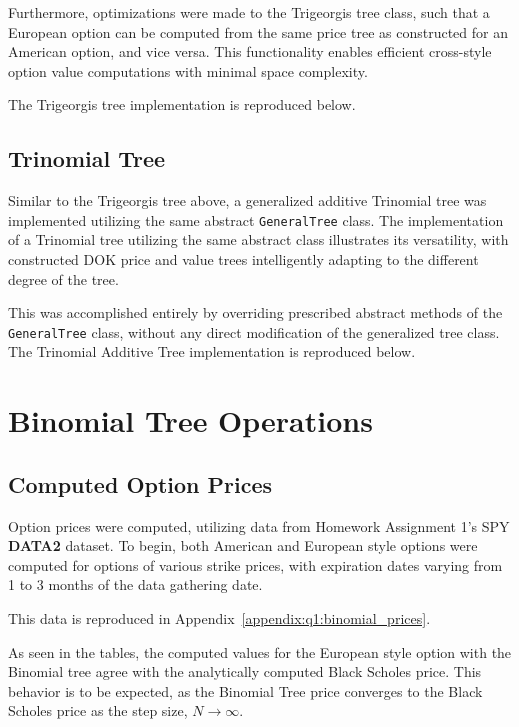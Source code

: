 \documentclass[10pt]{article}
\begin{document}
    Furthermore, optimizations were made to the Trigeorgis tree class, such that a European option can be computed from the same price tree as constructed for an American option, and vice versa. This functionality enables efficient cross-style option value computations with minimal space complexity.

    The Trigeorgis tree implementation is reproduced below.

        

    \newpage
    \subsection{Trinomial Tree}

    
    Similar to the Trigeorgis tree above, a generalized additive Trinomial tree was implemented utilizing the same abstract \texttt{GeneralTree} class. The implementation of a Trinomial tree utilizing the same abstract class illustrates its versatility, with constructed DOK price and value trees intelligently adapting to the different degree of the tree.
    
    This was accomplished entirely by overriding prescribed abstract methods of the \texttt{GeneralTree} class, without any direct modification of the generalized tree class. The Trinomial Additive Tree implementation is reproduced below.

    
    
\newpage
\section{Binomial Tree Operations}

    \subsection{Computed Option Prices}

    Option prices were computed, utilizing data from Homework Assignment 1's SPY \textbf{DATA2} dataset. To begin, both American and European style options were computed for options of various strike prices, with expiration dates varying from 1 to 3 months of the data gathering date.

    This data is reproduced in Appendix~\ref{appendix:q1:binomial_prices}.

    As seen in the tables, the computed values for the European style option with the Binomial tree agree with the analytically computed Black Scholes price. This behavior is to be expected, as the Binomial Tree price converges to the Black Scholes price as the step size, $N \rightarrow \infty$.
\end{document}

